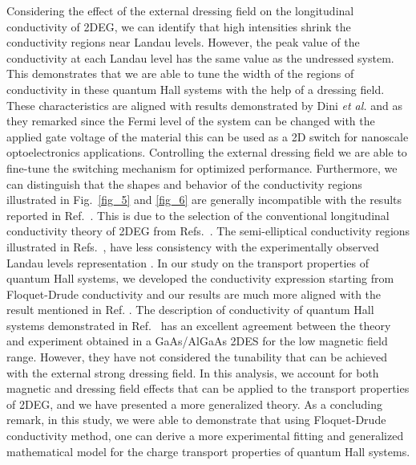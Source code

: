 Considering the effect of the external dressing field on the longitudinal conductivity of 2DEG, we can identify that high intensities shrink the conductivity regions near Landau levels. However, the peak value of the conductivity at each Landau level has the same value as the undressed system. This demonstrates that we are able to tune the width of the regions of conductivity in these quantum Hall systems with the help of a dressing field.
These characteristics are aligned with results demonstrated by Dini \textit{et al.} \cite{dini16} and as they remarked since the Fermi level of the system can be changed with the applied gate voltage of the material this can be used as a 2D switch for nanoscale optoelectronics applications. Controlling  the external dressing field we are able to fine-tune the switching mechanism for optimized performance.
Furthermore, we can distinguish that the shapes and behavior of the conductivity regions illustrated in Fig.~\ref{fig_5} and \ref{fig_6} are generally incompatible with the results reported in Ref.~\cite{dini16}. This is due to the selection of the conventional longitudinal conductivity theory of 2DEG from Refs.~\cite{ando74_1,ando82}. The semi-elliptical conductivity regions illustrated in Refs.~\cite{dini16,ando74_1,ando82}, have less consistency with the experimentally observed Landau levels representation \cite{endo09}.
In our study on the transport properties of quantum Hall systems, we developed the conductivity expression starting from Floquet-Drude conductivity \cite{wackerl20} and our results are much more aligned with the result mentioned in Ref. \cite{endo09}.
The description of conductivity of quantum Hall systems demonstrated in Ref.~\cite{endo09} has an excellent agreement between the theory and experiment obtained in a GaAs/AlGaAs 2DES for the low magnetic field range. However, they have not considered the tunability that can be achieved with the external strong dressing field. In this analysis, we account for both magnetic and dressing field effects that can be applied to the transport properties of 2DEG, and we have presented a more generalized theory. As a concluding remark, in this study, we were able to demonstrate that using Floquet-Drude conductivity method, one can derive a more experimental fitting and generalized mathematical model for the charge transport properties of quantum Hall systems.
